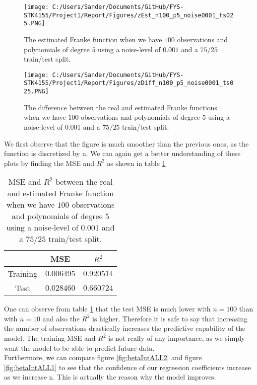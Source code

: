 \documentclass[12pt,a4paper]{article}
\begin{document}
\begin{figure}[H]
\centering
\texttt{[image: C:/Users/Sander/Documents/GitHub/FYS-STK4155/Project1/Report/Figures/zEst\_n100\_p5\_noise0001\_ts025.PNG]}
\caption{\label{fig:FrankeEst2} The estimated Franke function when we have $100$ observations and polynomials of degree $5$ using a noise-level of $0.001$ and a $75/25$ train/test split.}
\end{figure}

\begin{figure}[H]
\centering
\texttt{[image: C:/Users/Sander/Documents/GitHub/FYS-STK4155/Project1/Report/Figures/zDiff\_n100\_p5\_noise0001\_ts025.PNG]}
\caption{\label{fig:FrankeDIFF2} The difference between the real and estimated Franke functions when we have $100$ observations and polynomials of degree $5$ using a noise-level of $0.001$ and a $75/25$ train/test split.}
\end{figure}

\noindent We first observe that the figure is much smoother than the previous ones, as the function is discretized by n. We can again get a better understanding of these plots by finding the MSE and $R^2$ as shown in table \ref{tab:ESTREAL2}

\begin{table}[h]
\caption{\label{tab:ESTREAL2} MSE and $R^2$ between the real and estimated Franke function when we have $100$ observations and polynomials of degree $5$ using a noise-level of $0.001$ and a $75/25$ train/test split.}
\centering
\begin{tabular}{c|c|c}
 & MSE & $R^2$\\
\hline
Training & $0.006495$ & $0.920514$\\
\hline
Test & $0.028460$ & $0.660724$\\	  
\end{tabular}
\end{table}

\noindent One can observe from table \ref{tab:ESTREAL2} that the test MSE is much lower with $n = 100$ than with $n = 10$ and also the $R^2$ is higher. Therefore it is safe to say that increasing the number of observations drastically increases the predictive capability of the model. The training MSE and $R^2$ is not really of any importance, as we simply want the model to be able to predict future data. 
\\
Furthermore, we can compare figure \ref{fig:betaIntALL2} and figure \ref{fig:betaIntALL1} to see that the confidence of our regression coefficients increase as we increase n. This is actually the reason why the model improves.
\end{document}
